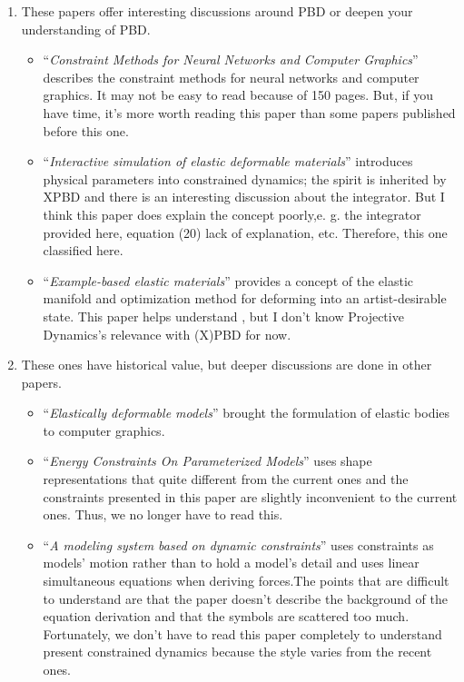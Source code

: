 \documentclass[pdflatex,sn-mathphys-num]{sn-jnl}%
\theoremstyle{thmstyleone}%
\theoremstyle{thmstyletwo}%
\theoremstyle{thmstylethree}%
\newcommand{\pname}[1]{``{\sl #1}''}
\begin{document}
\begin{enumerate}
		\item These papers offer interesting discussions around PBD or deepen your understanding of PBD.
		\begin{itemize}
			\item \pname{Constraint Methods for Neural Networks and Computer Graphics}\cite{ConstrainedPlatt} describes the constraint methods for neural networks and computer graphics.
			It may not be easy to read because of 150 pages. But, if you have time, it's more worth reading this paper than some papers published before this one.
			\item \pname{Interactive simulation of elastic deformable materials}\cite{Servin2006InteractiveSO} introduces physical parameters into constrained dynamics; the spirit is inherited by XPBD and there is an interesting discussion about the integrator. But I think this paper does explain the concept poorly,e. g. the integrator provided here, equation (20) lack of explanation, etc. 
			Therefore, this one classified here.
			\item \pname{Example-based elastic materials}\cite{Example-basedMartin} provides a concept of the elastic manifold and optimization method for deforming into an artist-desirable state. This paper helps understand \cite{ProjDyn}, but I don't know Projective Dynamics's relevance with (X)PBD for now.
		\end{itemize}
	\item These ones have historical value, but deeper discussions are done in other papers.
		\begin{itemize}
		\item \pname{Elastically deformable models}\cite{ElasticTerzopoulos}  brought the formulation of elastic bodies to computer graphics.
		\item \pname{Energy Constraints On Parameterized Models}\cite{Witkin1987} uses shape representations that quite different from the current ones and the constraints presented in this paper are slightly inconvenient to the current ones. Thus, we no longer have to read this.
		\item \pname{A modeling system based on dynamic constraints}\cite{Barzel1988} uses constraints as models' motion rather than to hold a model's detail and uses linear simultaneous equations when deriving forces.The points that are difficult to understand are that the paper doesn't describe the background of the equation derivation and that the symbols are scattered too much.
		Fortunately, we don't have to read this paper completely to understand present constrained dynamics because the style varies from the recent ones.

\end{itemize}
\end{enumerate}
\end{document}

